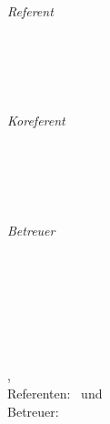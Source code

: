 \begin{titlepage}
	\vfill
	\begin{minipage}[t]{.27\textwidth}
		\raggedleft
		\textit{Referent}
	\end{minipage}
	\hspace*{15pt}
	\begin{minipage}[t]{.65\textwidth}
		{\Large \thesisFirstReviewer} \\
		{\small \thesisFirstReviewerUniversity} \\[-1mm]
	  	{\small \thesisFirstReviewerDepartment}
	\end{minipage} \\[5mm]
	\begin{minipage}[t]{.27\textwidth}
		\raggedleft
		\textit{Koreferent}
	\end{minipage}
	\hspace*{15pt}
	\begin{minipage}[t]{.65\textwidth}
		{\Large \thesisSecondReviewer} \\
		{\small \thesisSecondReviewerUniversity} \\[-1mm]
	  	{\small \thesisSecondReviewerDepartment}
	\end{minipage} \\[10mm]
	\begin{minipage}[t]{.27\textwidth}
		\raggedleft
		\textit{Betreuer}
	\end{minipage}
	\hspace*{15pt}
	\begin{minipage}[t]{.65\textwidth}
        {\Large \thesisFirstSupervisor} \\
	  	{\small \thesisFirstSupervisorCompany}
	\end{minipage} \\[10mm]

	\thesisDate \\

\end{titlepage}


\hfill
\vfill
{
	\small
	\textbf{\thesisName} \\
	\textit{\thesisTitle} \\
	\thesisSubject, \thesisDate \\
	Referenten: \thesisFirstReviewer\ und \thesisSecondReviewer \\
	Betreuer: \thesisFirstSupervisor \\[1.5em]
	\textbf{\thesisUniversity} \\
	\thesisUniversityInstitute \\
	\thesisUniversityDepartment \\
	\thesisUniversityStreetAddress \\
	\thesisUniversityPostalCode\ \thesisUniversityCity
}
